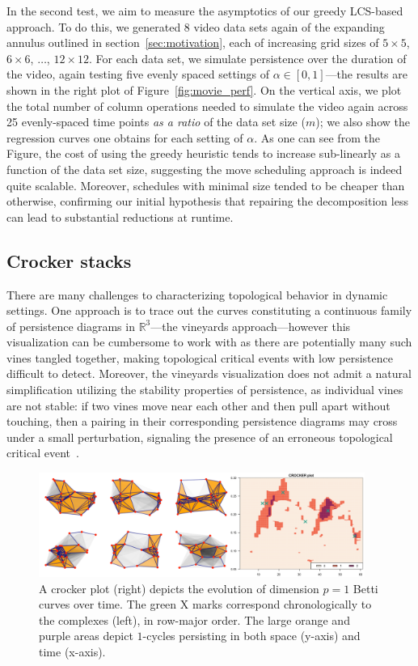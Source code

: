 \documentclass[sn-mathphys]{sn-jnl}
\begin{document}
In the second test, we aim to measure the asymptotics of our greedy LCS-based approach. To do this, we generated 8 video data sets again of the expanding annulus outlined in section~\ref{sec:motivation}, each of increasing grid sizes of $5 \times 5$, $6 \times 6$, $\dots$, $12 \times 12$. For each data set, we simulate persistence over the duration of the video, again testing five evenly spaced settings of $\alpha \in [0,1]$---the results are shown in the right plot of Figure~\ref{fig:movie_perf}. On the vertical axis, we plot the total number of column operations needed to simulate the video again across 25 evenly-spaced time points \emph{as a ratio} of the data set size ($m$); we also show the regression curves one obtains for each setting of $\alpha$. As one can see from the Figure, the cost of using the greedy heuristic tends to increase sub-linearly as a function of the data set size, suggesting the move scheduling approach is indeed quite scalable. Moreover, schedules with minimal size tended to be cheaper than otherwise, confirming our initial hypothesis that repairing the decomposition less can lead to substantial reductions at runtime.  

\subsection{Crocker stacks}
There are many challenges to characterizing topological behavior in dynamic settings. One approach is to trace out the curves constituting a continuous family of persistence diagrams in $\mathbb{R}^3$---the vineyards approach---however this visualization can be cumbersome to work with as there are potentially many such vines tangled together, making topological critical events with low persistence difficult to detect. Moreover, the vineyards visualization does not admit a natural simplification utilizing the stability properties of persistence, as individual vines are not stable: if two vines move near each other and then pull apart without touching, then a pairing in their corresponding persistence diagrams may cross under a small perturbation, signaling the presence of an erroneous topological critical event~\cite{topaz2015topological, xian2020capturing}. 

\begin{figure}[t]
	\centering
	\includegraphics[width=0.95\textwidth]{crocker_combo_1.png}
	\caption{A crocker plot (right) depicts the evolution of dimension $p = 1$ Betti curves over time. The green $\mathrm{X}$ marks correspond chronologically to the complexes (left), in row-major order. The large orange and purple areas depict $1$-cycles persisting in both space (y-axis) and time (x-axis).} \label{fig:crocker1}
\end{figure}
\end{document}
